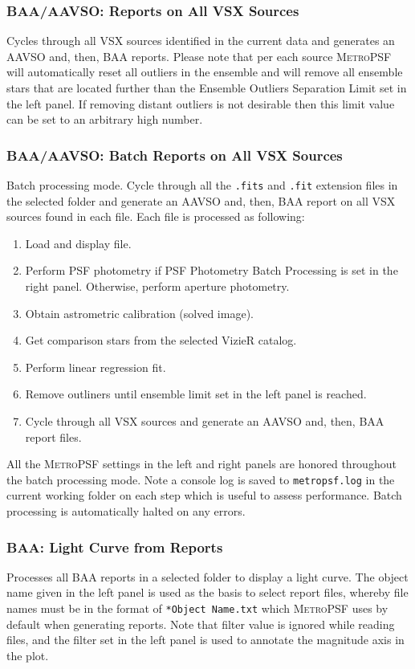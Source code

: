 \documentclass{article}
\begin{document}
\subsubsection{BAA/AAVSO: Reports on All VSX Sources}
Cycles through all VSX sources identified in the current data and generates an AAVSO and, then, BAA reports. Please note that per each source \textsc{MetroPSF} will automatically reset all outliers in the ensemble and will remove all ensemble stars that are located further than the Ensemble Outliers Separation Limit set in the left panel. If removing distant outliers is not desirable then this limit value can be set to an arbitrary high number.  

\subsubsection{BAA/AAVSO: Batch Reports on All VSX Sources} \label{batch}
Batch processing mode. Cycle through all the \texttt{.fits} and \texttt{.fit} extension files in the selected folder and generate an AAVSO and, then, BAA report on all VSX sources found in each file. Each file is processed as following: 
\begin{enumerate}
\item Load and display file.
\item Perform PSF photometry if PSF Photometry Batch Processing is set in the right panel. Otherwise, perform aperture photometry. 
\item Obtain astrometric calibration (solved image). 
\item Get comparison stars from the selected VizieR catalog. 
\item Perform linear regression fit.
\item Remove outliners until ensemble limit set in the left panel is reached.
\item Cycle through all VSX sources and generate an AAVSO and, then, BAA report files. 
\end{enumerate}
All the \textsc{MetroPSF} settings in the left and right panels are honored throughout the batch processing mode. Note a console log is saved to \texttt{metropsf.log} in the current working folder on each step which is useful to assess performance. Batch processing is automatically halted on any errors.

\subsubsection{BAA: Light Curve from Reports}
Processes all BAA reports in a selected folder to display a light curve. The object name given in the left panel is used as the basis to select report files, whereby file names must be in the format of \texttt{*Object Name.txt} which \textsc{MetroPSF} uses by default when generating reports. Note that filter value is ignored while reading files, and the filter set in the left panel is used to annotate the magnitude axis in the plot.
\end{document}
